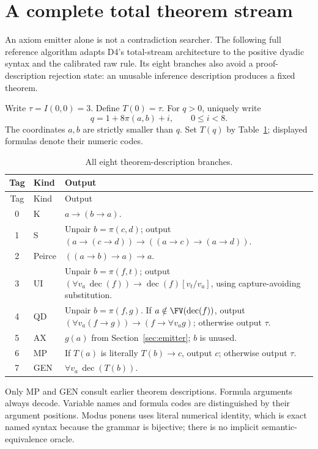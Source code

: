 \section{A complete total theorem stream}
\label{sec:stream}

An axiom emitter alone is not a contradiction searcher. The following full reference algorithm adapts D4's total-stream architecture \cite{draftStream} to the positive dyadic syntax and the calibrated raw rule. Its eight branches also avoid a proof-description rejection state: an unusable inference description produces a fixed theorem.

Write $\tau=I(0,0)=3$. Define $T(0)=\tau$. For $q>0$, uniquely write
\[
                  q=1+8\pi(a,b)+i,\qquad 0\le i<8.
\]
The coordinates $a,b$ are strictly smaller than $q$. Set $T(q)$ by Table~\ref{tab:stream}; displayed formulas denote their numeric codes.

\begin{longtable}{@{}cl>{\raggedright\arraybackslash}p{}@{}}
\caption{All eight theorem-description branches.}\label{tab:stream}\\
\toprule Tag & Kind & Output\\\midrule\endfirsthead
\toprule Tag & Kind & Output\\\midrule\endhead
0 & K & $a\to(b\to a)$.\\[4pt]
1 & S & Unpair $b=\pi(c,d)$; output
$(a\to(c\to d))\to((a\to c)\to(a\to d))$.\\[4pt]
2 & Peirce & $((a\to b)\to a)\to a$.\\[4pt]
3 & UI & Unpair $b=\pi(f,t)$; output
$(\forall v_a\,\operatorname{dec}(f))\to
 \operatorname{dec}(f)[v_t/v_a]$, using capture-avoiding substitution.\\[4pt]
4 & QD & Unpair $b=\pi(f,g)$. If $a\notin\FV(\operatorname{dec}(f))$, output
$(\forall v_a(f\to g))\to(f\to\forall v_a g)$; otherwise output $\tau$.\\[4pt]
5 & AX & $g(a)$ from Section~\ref{sec:emitter}; $b$ is unused.\\[4pt]
6 & MP & If $T(a)$ is literally $T(b)\to c$, output $c$; otherwise output $\tau$.\\[4pt]
7 & GEN & $\forall v_a\,\operatorname{dec}(T(b))$.\\
\bottomrule
\end{longtable}

Only MP and GEN consult earlier theorem descriptions. Formula arguments always decode. Variable names and formula codes are distinguished by their argument positions. Modus ponens uses literal numerical identity, which is exact named syntax because the grammar is bijective; there is no implicit semantic-equivalence oracle.

